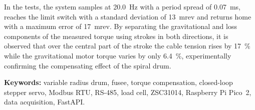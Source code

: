 In the tests, the system samples at \SI{20.0}{\hertz} with a period spread of
\SI{0.07}{\milli\second}, reaches the limit switch with a standard deviation of
\SI{13}{mrev} and returns home with a maximum error of \SI{17}{mrev}. By
separating the gravitational and loss components of the measured torque using strokes in both
directions, it is observed that over the central part of the stroke the cable tension rises by
\SI{17}{\percent} while the gravitational motor torque varies by only \SI{6.4}{\percent},
experimentally confirming the compensating effect of the spiral drum.

\vspace{1em}
\noindent\textbf{Keywords:} variable radius drum, fusee, torque compensation, closed-loop stepper
servo, Modbus RTU, RS-485, load cell, ZSC31014, Raspberry Pi Pico~2, data acquisition, FastAPI.

\cleardoublepage
